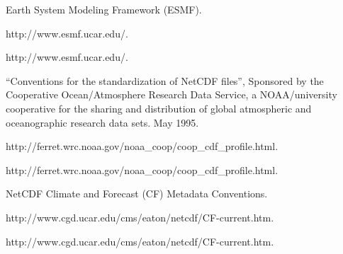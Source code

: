 \documentclass[12pt]{article}
\begin{document}
\begin{thebibliography}{99}

Earth System Modeling Framework (ESMF).\\
\begin{htmlonly}
{http://www.esmf.ucar.edu/}.
\end{htmlonly}
\begin{latexonly}
http://www.esmf.ucar.edu/.
\end{latexonly}

``Conventions for the standardization of NetCDF files'',
Sponsored by the Cooperative Ocean/Atmosphere Research Data Service, a
NOAA/university cooperative for the sharing and distribution of global
atmospheric and oceanographic research data sets.  May 1995.\\
\begin{htmlonly}
{http://ferret.wrc.noaa.gov/noaa_coop/coop_cdf_profile.html}.
\end{htmlonly}
\begin{latexonly}
http://ferret.wrc.noaa.gov/noaa\_coop/coop\_cdf\_profile.html.
\end{latexonly}

NetCDF Climate and Forecast (CF) Metadata Conventions.\\
\begin{htmlonly}
{http://www.cgd.ucar.edu/cms/eaton/netcdf/CF-current.htm}.
\end{htmlonly}
\begin{latexonly}
http://www.cgd.ucar.edu/cms/eaton/netcdf/CF-current.htm.
\end{latexonly}

\end{thebibliography}

\end{document}
